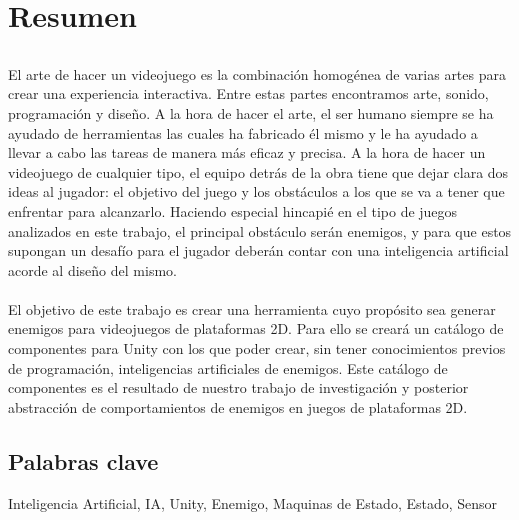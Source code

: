 \chapter*{Resumen}

\section*{\tituloPortadaVal}

El arte de hacer un videojuego es la combinación homogénea de varias artes para crear una experiencia interactiva. Entre estas partes encontramos arte, sonido, programación y diseño. A la hora de hacer el arte, el ser humano siempre se ha ayudado de herramientas las cuales ha fabricado él mismo y le ha ayudado a llevar a cabo las tareas de manera más eficaz y precisa.
A la hora de hacer un videojuego de cualquier tipo, el equipo detrás de la obra tiene que dejar clara dos ideas al jugador: el objetivo del juego y los obstáculos a los que se va a tener que enfrentar para alcanzarlo. Haciendo especial hincapié en el tipo de juegos analizados en este trabajo, el principal obstáculo serán enemigos, y para que estos supongan un desafío para el jugador deberán contar con una inteligencia artificial acorde al diseño del mismo.\\\\ 

El objetivo de este trabajo es crear una herramienta cuyo propósito sea generar enemigos para videojuegos de plataformas 2D. Para ello se creará un catálogo de componentes para Unity con los que poder crear, sin tener conocimientos previos de programación, inteligencias artificiales de enemigos. Este catálogo de componentes es el resultado de nuestro trabajo de investigación y posterior abstracción de comportamientos de enemigos en juegos de plataformas 2D. 
\section*{Palabras clave}
   
\noindent Inteligencia Artificial, IA, Unity, Enemigo, Maquinas de Estado, Estado, Sensor

   



